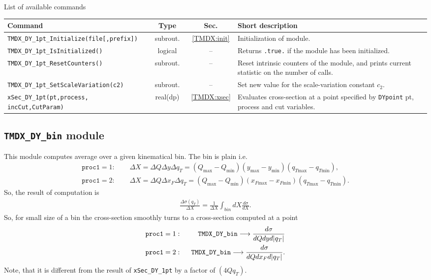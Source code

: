 \documentclass[prd,nofootinbib,eqsecnum,final]{revtex4}
\renewcommand{\(}{\left(}
\renewcommand{\)}{\right)}
\renewcommand{\[}{\left[}
\renewcommand{\]}{\right]}
\begin{document}
\begin{center}
List of available commands
\\
\begin{tabular}{||p{6cm}|c|c|p{8cm}||}
\hline\hline
Command & ~~Type~~& ~~Sec.~~ & Short description
\\\hline
\texttt{TMDX{\_}DY{\_}1pt{\_}Initialize(file[,prefix])} & subrout. & \ref{TMDX:init} & Initialization of module.
\\\hline
\texttt{TMDX{\_}DY{\_}1pt{\_}IsInitialized()} & logical & -- & Returns \texttt{.true.} if the module has been initialized.
\\\hline
\texttt{TMDX{\_}DY{\_}1pt{\_}ResetCounters()} & subrout. & -- & Reset intrinsic counters of the module, and prints current statistic on the number of calls.
\\\hline
\texttt{TMDX{\_}DY{\_}1pt{\_}SetScaleVariation(c2)} & subrout. & -- & Set new value for the scale-variation constant $c_2$.
\\\hline
\texttt{xSec\_DY\_1pt(pt,process,} \texttt{incCut,CutParam)} & real(dp) &\ref{TMDX:xsec} & Evaluates cross-section at a point specified by \texttt{DYpoint} pt, process and cut variables.
\\\hline\hline
\end{tabular}
\end{center}

\subsection{\texttt{TMDX{\_}DY{\_}bin} module}

This module computes average over a given kinematical bin. The bin is plain i.e.
\begin{eqnarray}
\texttt{proc1}=1:~~&&\Delta X=\Delta Q \Delta y \Delta q_T = (Q_{\text{max}}-Q_{\text{min}})(y_{\text{max}}-y_{\text{min}})(q_{T\text{max}}-q_{T\text{min}}),
\\
\texttt{proc1}=2:~~&&\Delta X=\Delta Q \Delta x_F \Delta q_T = (Q_{\text{max}}-Q_{\text{min}})(x_{F\text{max}}-x_{F\text{min}})(q_{T\text{max}}-q_{T\text{min}}).
\end{eqnarray}
So, the result of computation is
\begin{eqnarray}
\frac{\Delta\sigma(q_T)}{\Delta X}=\frac{1}{\Delta X}\int_{bin} dX \frac{d\sigma}{dX}.
\end{eqnarray}
So, for small size of a bin the cross-section smoothly turns to a cross-section computed at a point 
\begin{eqnarray}
\texttt{proc1}=1:~~&&\text{\texttt{TMDX\_DY{\_}bin}}\longrightarrow \frac{d\sigma}{dQ dy d|q_T|}
\\
\texttt{proc1}=2:~~&&\text{\texttt{TMDX\_DY{\_}bin}}\longrightarrow \frac{d\sigma}{dQ dx_F d|q_T|}.
\end{eqnarray}
Note, that it is different from the result of \texttt{xSec\_DY\_1pt} by a factor of $(4Qq_T)$.
\end{document}
